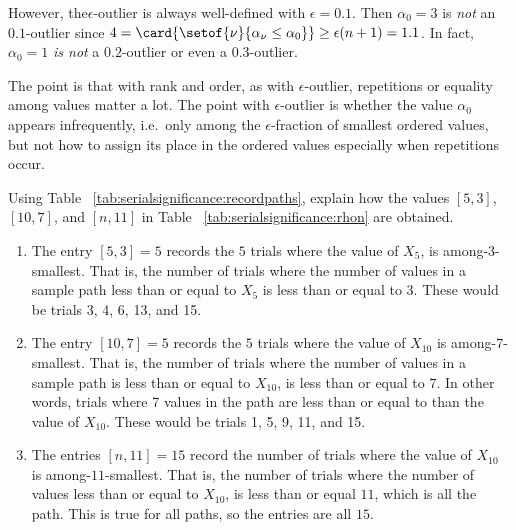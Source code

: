 \documentclass[12pt]{article}
\begin{document}
\begin{solution}
    However, the\( \epsilon \)-outlier is always well-defined with \(
    \epsilon = 0.1 \).  Then \( \alpha_0 = 3 \) is \emph{not} an \( 0.1 \)-outlier
    since \( 4 = \card{%
    \setof{\nu}{\alpha_{\nu} \le \alpha_0}} \ge \epsilon(n+1) = 1.1 \).
    In fact, \( \alpha_0 = 1 \) \emph{is not} a \( 0.2 \)-outlier or
    even a \( 0.3 \)-outlier.

    The point is that with rank and order, as with \( \epsilon \)-outlier,
    repetitions or equality among values matter a lot.  The point with \(
    \epsilon \)-outlier is whether the value \( \alpha_0 \) appears
    infrequently, i.e.\ only among the \( \epsilon \)-fraction of
    smallest ordered values, but not how to assign its place in the
    ordered values especially when repetitions occur.
\end{solution}

\begin{exercise}
    Using Table~%
    \ref{tab:serialsignificance:recordpaths}, explain how the values \(
    [5,3] \), \( [10, 7] \), and \( [n, 11] \) in  Table~%
    \ref{tab:serialsignificance:rhon}
    are obtained.
\end{exercise}
\begin{solution}
    \begin{enumerate}
        \item
            The entry \( [5,3] = 5 \) records the \( 5 \) trials where
            the value of \( X_5 \), is among-3-smallest.  That is, the
            number of trials where the number of values in a sample path
            less than or equal to \( X_5 \) is less
            than or equal to \( 3 \).  These would be trials 3, 4, 6,
            13, and 15.
        \item
            The entry \( [10, 7] = 5 \) records the \( 5 \) trials
            where the value of \( X_{10} \) is among-\( 7 \)-smallest.
            That is, the number of trials where the number of values
            in a sample path is less than or equal to \(
            X_{10} \), is less than or equal to \( 7 \).  In other words,
            trials where 7 values in the path are less than or
            equal to than the value of \( X_{10} \).  These would be
            trials 1, 5, 9, 11, and 15.
        \item
            The entries \( [n, 11] = 15 \) record the number of trials
            where the value of \( X_{10} \) is among-\( 11 \)-smallest.
            That is, the number of trials where the number of values
            less than or equal to \(   X_{10} \), is less than or equal
            \( 11 \), which is all the
            path.  This is true for all paths, so the
            entries are all \( 15 \).
    \end{enumerate}
\end{solution}
\end{document}
